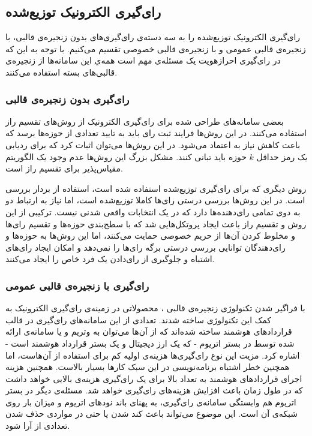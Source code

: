 \subsection{رای‌گیری الکترونیک توزیع‌شده}
رای‌گیری الکترونیک توزیع‌شده را به سه دسته‌ی رای‌گیری‌های بدون زنجیره‌ی قالبی، با زنجیره‌ی قالبی عمومی و با زنجیره‌ی قالبی خصوصی تقسیم می‌کنیم. با توجه به این که در رای‌گیری احرازهویت یک مسئله‌ی مهم است همه‌ي این سامانه‌ها از زنجیره‌ی قالبی‌های بسته استفاده می‌کنند.
\subsubsection{رای‌گیری بدون زنجیره‌ی قالبی} 
بعضی سامانه‌های طراحی شده برای رای‌گیری الکترونیک
\cite{secret1}
\cite{secret2}
\cite{secret3}
از روش‌های تقسیم راز
استفاده می‌کنند. در این روش‌ها فرایند ثبت رای باید به تایید تعدادی از حوزه‌ها برسد که باعث کاهش نیاز به اعتماد می‌شود. در این روش‌ها می‌توان اثبات کرد که برای ردیابی یک رمز حداقل $k$ حوزه باید تبانی کنند. مشکل بزرگ این روش‌ها عدم وجود یک الگوریتم مقیاس‌پذیر برای تقسیم راز است.
\par
روش دیگری که برای رای‌گیری توزیع‌شده استفاده شده است، استفاده از بردار‌ بررسی
\cite{checkvector}
است. در این روش‌ها بررسی درستی رای‌ها کاملا توزیع‌شده‌ است، اما نیاز به ارتباط دو به دوی تمامی رای‌دهنده‌ها دارد که در یک انتخابات واقعی شدنی نیست. ترکیبی از این روش و تقسیم راز باعث ایجاد پروتکل‌هایی
\cite{MPO1} \cite{evotinwocrypto}
شد که با سطح‌بندی حوزه‌ها و تقسیم رای‌ها و مخلوط کردن آن‌ها از حریم خصوصی حمایت می‌کنند، اما این روش‌ها به حوزه‌ها و رای‌دهندگان توانایی بررسی درستی برگه رای‌ها را نمی‌دهد و امکان ایجاد رای‌های اشتباه و جلوگیری از رای‌دادن یک فرد خاص را ایجاد می‌کنند. 


\subsubsection{رای‌گیری با زنجیره‌ی قالبی عمومی}
با فراگیر شدن تکنولوژی زنجیره‌ی قالبی
\cite{rosgood}
، محصولاتی در زمینه‌ی رای‌گیری الکترونیک به کمک این تکنولوژی ساخته شدند. تعدادی از این سامانه‌های رای‌گیری در قالب قرارداد‌های هوشمند
\cite{SmartContract}
ساخته‌ شده‌اند که از آن‌ها می‌توان به وتریم 
\cite{votereum}
و یا سامانه‌ی ارائه شده توسط
\cite{yavuz}
در بستر اتریوم
\cite{Ethereum}
- که یک ارز دیجیتال و یک بستر قرارداد هوشمند است - 
اشاره کرد. مزیت این نوع رای‌گیری‌ها هزینه‌ی اولیه کم برای استفاده از آن‌هاست، اما همچنین خطر اشتباه برنامه‌نویسی
\cite{surveyAtt}
\cite{gyges} \cite{smart}
در این سبک کارها بسیار بالاست. همچنین هزینه اجرای قراردادهای هوشمند به تعداد بالا برای یک رای‌گیری هزینه‌ی بالایی خواهد داشت که در طول زمان باعث افزایش هزینه‌های رای‌گیری خواهد شد. مسئله‌ی دیگر در بستر اتریوم هم وابستگی سامانه‌ی رای‌گیری، به پهنای باند نود‌های اتریوم و میزان بار روی شبکه‌ی آن است. این موضوع می‌تواند باعث کند شدن یا حتی در مواردی حذف شدن تعدادی از آرا شود.

